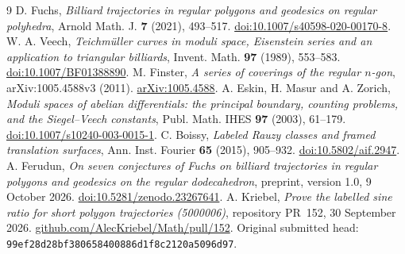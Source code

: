 \documentclass[11pt]{article}
\begin{document}
\begin{thebibliography}{9}
 D. Fuchs, \emph{Billiard trajectories in regular polygons and geodesics on regular polyhedra}, Arnold Math. J. \textbf{7} (2021), 493--517.
\href{https://doi.org/10.1007/s40598-020-00170-8}{doi:10.1007/s40598-020-00170-8}.
 W. A. Veech, \emph{Teichm\"uller curves in moduli space, Eisenstein series and an application to triangular billiards}, Invent. Math. \textbf{97} (1989), 553--583.
\href{https://doi.org/10.1007/BF01388890}{doi:10.1007/BF01388890}.
 M. Finster, \emph{A series of coverings of the regular \(n\)-gon}, arXiv:1005.4588v3 (2011).
\href{https://arxiv.org/abs/1005.4588}{arXiv:1005.4588}.
 A. Eskin, H. Masur and A. Zorich, \emph{Moduli spaces of abelian differentials: the principal boundary, counting problems, and the Siegel--Veech constants}, Publ. Math. IHES \textbf{97} (2003), 61--179.
\href{https://doi.org/10.1007/s10240-003-0015-1}{doi:10.1007/s10240-003-0015-1}.
 C. Boissy, \emph{Labeled Rauzy classes and framed translation surfaces}, Ann. Inst. Fourier \textbf{65} (2015), 905--932.
\href{https://doi.org/10.5802/aif.2947}{doi:10.5802/aif.2947}.
 A. Ferudun, \emph{On seven conjectures of Fuchs on billiard trajectories in regular polygons and geodesics on the regular dodecahedron}, preprint, version 1.0, 9 October 2026.
\href{https://doi.org/10.5281/zenodo.23267641}{doi:10.5281/zenodo.23267641}.
 A. Kriebel, \emph{Prove the labelled sine ratio for short polygon trajectories (5000006)}, repository PR~152, 30 September 2026.
\href{https://github.com/AlecKriebel/Math/pull/152}{github.com/AlecKriebel/Math/pull/152}.
Original submitted head: \texttt{99ef28d28bf380658400886d1f8c2120a5096d97}.
\end{thebibliography}
\end{document}
